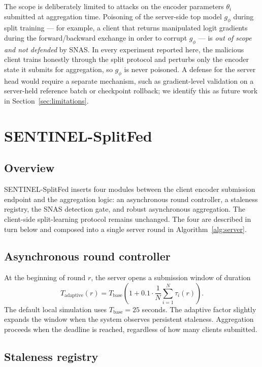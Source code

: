 \documentclass[pdflatex,sn-mathphys-num]{sn-jnl}
\begin{document}
The scope is deliberately limited to attacks on the encoder parameters $\theta_i$ submitted at aggregation time. Poisoning of the server-side top model $g_\phi$ during split training --- for example, a client that returns manipulated logit gradients during the forward/backward exchange in order to corrupt $g_\phi$ --- is \emph{out of scope and not defended} by SNAS. In every experiment reported here, the malicious client trains honestly through the split protocol and perturbs only the encoder state it submits for aggregation, so $g_\phi$ is never poisoned. A defense for the server head would require a separate mechanism, such as gradient-level validation on a server-held reference batch or checkpoint rollback; we identify this as future work in Section~\ref{sec:limitations}.

\section{SENTINEL-SplitFed}\label{sec:method}

\subsection{Overview}

SENTINEL-SplitFed inserts four modules between the client encoder submission endpoint and the aggregation logic: an asynchronous round controller, a staleness registry, the SNAS detection gate, and robust asynchronous aggregation. The client-side split-learning protocol remains unchanged. The four are described in turn below and composed into a single server round in Algorithm~\ref{alg:server}.

\subsection{Asynchronous round controller}

At the beginning of round $r$, the server opens a submission window of duration
\begin{equation}
    T_{\mathrm{adaptive}}(r) = T_{\mathrm{base}}\left(1 + 0.1\cdot \frac{1}{N}\sum_{i=1}^{N}\tau_i(r)\right).
\end{equation}
The default local simulation uses $T_{\mathrm{base}}=25$ seconds. The adaptive factor slightly expands the window when the system observes persistent staleness. Aggregation proceeds when the deadline is reached, regardless of how many clients submitted.

\subsection{Staleness registry}
\end{document}
